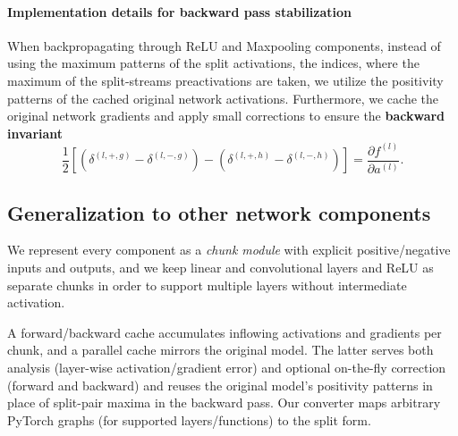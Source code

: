 \paragraph{Implementation details for backward pass stabilization}
When backpropagating through ReLU and Maxpooling components, instead of using the maximum patterns of the split activations, \ie the indices, where the maximum of the split-streams preactivations are taken, we utilize the positivity patterns of the cached original network activations.
Furthermore, we cache the original network gradients and apply small corrections to ensure the \textbf{backward invariant}
    \begin{equation}
        \frac{1}{2}\left[(\delta^{(l,+,g)} - \delta^{(l,-,g)}) -
        (\delta^{(l,+,h)} - \delta^{(l,-,h)})\right]
        = \frac{\partial f^{(l)}}{\partial a^{(l)}}.
        \label{eq:backward_invariant}
    \end{equation}

\subsection{Generalization to other network components} \label{subsec:other_components}

We represent every component as a \emph{chunk module} with explicit positive/negative inputs and outputs, and we keep linear and convolutional layers and ReLU as separate chunks in order to support multiple layers without intermediate activation.

A forward/backward cache accumulates inflowing activations and gradients per chunk, and a parallel cache mirrors the original model. The latter serves both analysis (layer-wise activation/gradient error) and optional on-the-fly correction (forward and backward) and reuses the original model’s positivity patterns in place of split-pair maxima in the backward pass.
Our converter maps arbitrary PyTorch graphs (for supported layers/functions) to the split form.

